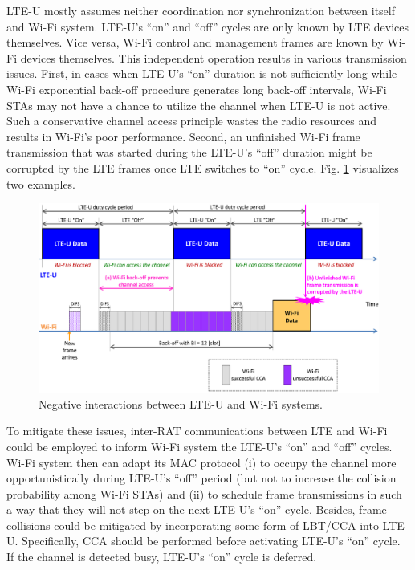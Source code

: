 \mbox{LTE-U} mostly assumes neither coordination nor synchronization between itself and \mbox{Wi-Fi} system. \mbox{LTE-U}'s ``on'' and ``off'' cycles are only known by LTE devices themselves. Vice versa, \mbox{Wi-Fi} control and management frames are known by \mbox{Wi-Fi} devices themselves. This independent operation results in various transmission issues. First, in cases when \mbox{LTE-U}'s ``on'' duration is not sufficiently long while \mbox{Wi-Fi} exponential back-off procedure generates long back-off intervals, \mbox{Wi-Fi} STAs may not have a chance to utilize the channel when \mbox{LTE-U} is not active. Such a conservative channel access principle wastes the radio resources and results in \mbox{Wi-Fi}'s poor performance. Second, an unfinished \mbox{Wi-Fi} frame transmission that was started during the \mbox{LTE-U}'s ``off'' duration might be corrupted by the LTE frames once LTE switches to ``on'' cycle. Fig. \ref{figs:LTE-U-enhancement1} visualizes two examples.
\begin{figure}[!ht]
	\centering
	\includegraphics[width=1.0\columnwidth]{figs/LTE-U-enhancement1}
	\caption{Negative interactions between \mbox{LTE-U} and \mbox{Wi-Fi} systems.}
	\label{figs:LTE-U-enhancement1}
\end{figure}

To mitigate these issues, inter-RAT communications between LTE and \mbox{Wi-Fi} could be employed to inform \mbox{Wi-Fi} system the \mbox{LTE-U}'s ``on'' and ``off'' cycles. \mbox{Wi-Fi} system then can adapt its MAC protocol (i) to occupy the channel more opportunistically during \mbox{LTE-U}'s ``off'' period (but not to increase the collision probability among \mbox{Wi-Fi} STAs) and (ii) to schedule frame transmissions in such a way that they will not step on the next \mbox{LTE-U}'s ``on'' cycle. Besides, frame collisions could be mitigated by incorporating some form of LBT/CCA into \mbox{LTE-U}. Specifically, CCA should be performed before activating \mbox{LTE-U}'s ``on'' cycle. If the channel is detected busy, \mbox{LTE-U}'s ``on'' cycle is deferred.

